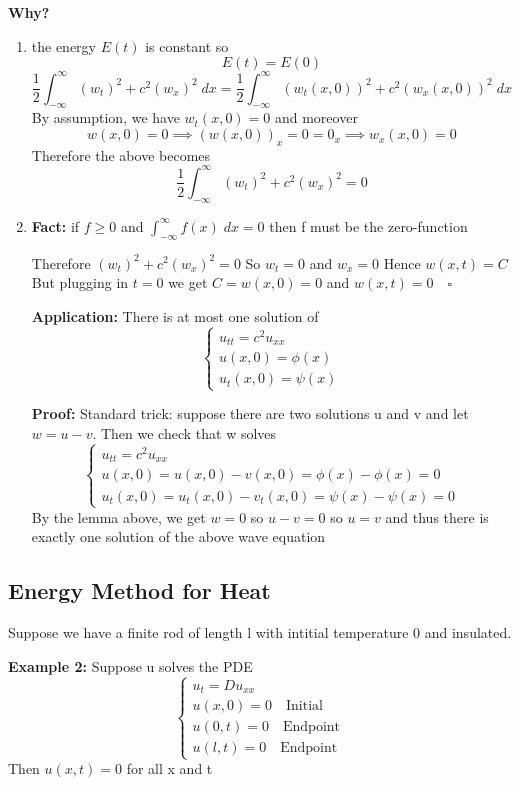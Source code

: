 \documentclass[12pt]{article}
\begin{document}
\textbf{Why?}
\begin{enumerate}
    \item the energy $E(t)$ is constant so 
    \[E(t) = E(0)\]
    \[\frac{1}{2} \int_{-\infty}^{\infty} (w_t)^2 + c^2 (w_x)^2 \; dx = \frac{1}{2} \int_{-\infty}^{\infty} (w_t(x, 0))^2 + c^2(w_x(x, 0))^2\; dx\]
    By assumption, we have $w_t(x, 0) = 0$ and moreover
    \[w(x, 0) = 0 \implies (w(x, 0))_x = 0 = 0_x \implies w_x(x, 0) = 0\]
    Therefore the above becomes 
    \[\frac{1}{2}\int_{-\infty}^{\infty} (w_t)^2 + c^2(w_x)^2 = 0\]

    \item 
    \textbf{Fact:} if $f \geq 0$ and $\int_{-\infty}^{\infty} f(x)\; dx = 0$ then f must be the zero-function  

    Therefore $(w_t)^2 + c^2(w_x)^2 = 0$ 
    So $w_t = 0$ and $w_x = 0$
    Hence $w(x, t) = C$
    But plugging in $t= 0$ we get $C = w(x, 0) = 0$ and $w(x, t) = 0 \quad \square$

    \textbf{Application:}
    There is at most one solution of 
    \[\begin{cases}
        u_{tt} = c^2 u_{xx}\\
        u(x, 0) = \phi(x)\\
        u_t(x, 0) = \psi(x)
    \end{cases}\]

    \textbf{Proof:}
    Standard trick: suppose there are two solutions u and v and let $w = u - v$. Then we check that w solves 
    \[\begin{cases}
        u_{tt} = c^2 u_{xx}\\
        u(x, 0) = u(x, 0) - v(x, 0) = \phi(x) - \phi(x) = 0\\
        u_t(x, 0) = u_t(x, 0) - v_t(x, 0) = \psi(x) - \psi(x) = 0
    \end{cases}\]
    By the lemma above, we get $w = 0$ so $u-v=0$ so $u=v$
    and thus there is exactly one solution of the above wave equation
\end{enumerate}

\subsection*{Energy Method for Heat}
Suppose we have a finite rod of length l with intitial temperature 0 and insulated. 

\textbf{Example 2:} 
Suppose u solves the PDE
\[\begin{cases}
    u_t = Du_{xx}\\
    u(x, 0) = 0\quad \text{Initial}\\
    u(0, t) = 0\quad \text{Endpoint}\\
    u(l, t) = 0\quad \text{Endpoint}
\end{cases}\]
Then $u(x, t) = 0$ for all x and t 
\end{document}
